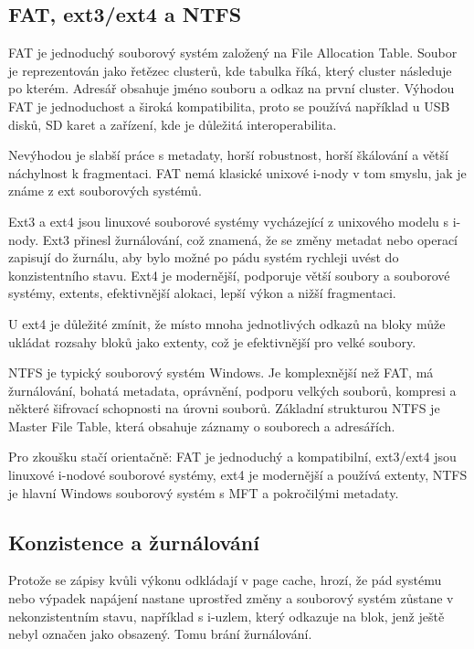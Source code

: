 \documentclass[11pt,a4paper]{article}
\begin{document}
\subsection*{FAT, ext3/ext4 a NTFS}

FAT je jednoduchý souborový systém založený na File Allocation Table. Soubor je reprezentován jako řetězec clusterů, kde tabulka říká, který cluster následuje po kterém. Adresář obsahuje jméno souboru a odkaz na první cluster. Výhodou FAT je jednoduchost a široká kompatibilita, proto se používá například u USB disků, SD karet a zařízení, kde je důležitá interoperabilita.

Nevýhodou je slabší práce s metadaty, horší robustnost, horší škálování a větší náchylnost k fragmentaci. FAT nemá klasické unixové i-nody v tom smyslu, jak je známe z ext souborových systémů.

Ext3 a ext4 jsou linuxové souborové systémy vycházející z unixového modelu s i-nody. Ext3 přinesl žurnálování, což znamená, že se změny metadat nebo operací zapisují do žurnálu, aby bylo možné po pádu systém rychleji uvést do konzistentního stavu. Ext4 je modernější, podporuje větší soubory a souborové systémy, extents, efektivnější alokaci, lepší výkon a nižší fragmentaci.

U ext4 je důležité zmínit, že místo mnoha jednotlivých odkazů na bloky může ukládat rozsahy bloků jako extenty, což je efektivnější pro velké soubory.

NTFS je typický souborový systém Windows. Je komplexnější než FAT, má žurnálování, bohatá metadata, oprávnění, podporu velkých souborů, kompresi a některé šifrovací schopnosti na úrovni souborů. Základní strukturou NTFS je Master File Table, která obsahuje záznamy o souborech a adresářích.

Pro zkoušku stačí orientačně: FAT je jednoduchý a kompatibilní, ext3/ext4 jsou linuxové i-nodové souborové systémy, ext4 je modernější a používá extenty, NTFS je hlavní Windows souborový systém s MFT a pokročilými metadaty.

\subsection*{Konzistence a žurnálování}

Protože se zápisy kvůli výkonu odkládají v page cache, hrozí, že pád systému nebo výpadek napájení nastane uprostřed změny a souborový systém zůstane v nekonzistentním stavu, například s i-uzlem, který odkazuje na blok, jenž ještě nebyl označen jako obsazený. Tomu brání žurnálování.
\end{document}
